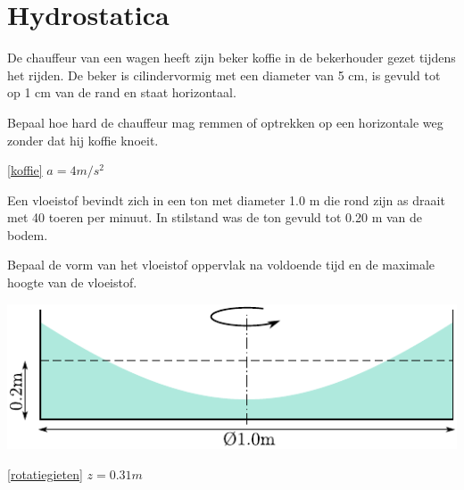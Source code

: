 \chapter{Hydrostatica}
\label{sec:Hydrostatica}
\begin{toepassing}
	\label{koffie}
De chauffeur van een wagen heeft zijn beker koffie in de bekerhouder gezet tijdens het rijden. De beker is cilindervormig met een diameter van 5 cm, is gevuld tot op 1 cm van de rand en staat horizontaal.
		
Bepaal hoe hard de chauffeur mag remmen of optrekken op een horizontale weg zonder dat hij koffie knoeit.
\end{toepassing}
\begin{antwoord}{\ref{koffie}}
	$a = 4\unit{m/s^2}$
\end{antwoord}
\begin{toepassing}
	\label{rotatiegieten}
Een vloeistof bevindt zich in een ton met diameter 1.0 m die rond zijn as draait met 40 toeren per minuut. In stilstand was de ton gevuld tot 0.20 m van de bodem. 
		
Bepaal de vorm van het vloeistof oppervlak na voldoende tijd en de maximale hoogte van de vloeistof.

	\centering
	\includegraphics{fig/hydrostatica/rotatiegieten}
\end{toepassing}
\begin{antwoord}{\ref{rotatiegieten}}
	$z = 0.31\unit{m}$ 
\end{antwoord}
